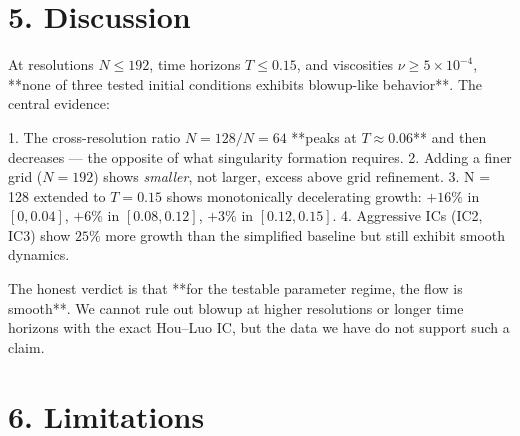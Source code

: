\documentclass[11pt]{article}
\begin{document}
\section{5. Discussion}

At resolutions \(N \le 192\), time horizons \(T \le 0.15\), and viscosities
\(\nu \ge 5 \times 10^{-4}\), **none of three tested initial conditions
exhibits blowup-like behavior**. The central evidence:

1. The cross-resolution ratio \(N = 128 / N = 64\) **peaks at
   \(T \approx 0.06\)** and then decreases — the opposite of what
   singularity formation requires.
2. Adding a finer grid (\(N = 192\)) shows \textit{smaller}, not larger,
   excess above grid refinement.
3. N = 128 extended to \(T = 0.15\) shows monotonically decelerating
   growth: \(+16\%\) in \([0, 0.04]\), \(+6\%\) in \([0.08, 0.12]\), \(+3\%\)
   in \([0.12, 0.15]\).
4. Aggressive ICs (IC2, IC3) show \(25\%\) more growth than the simplified
   baseline but still exhibit smooth dynamics.

The honest verdict is that **for the testable parameter regime, the
flow is smooth**. We cannot rule out blowup at higher resolutions or
longer time horizons with the exact Hou–Luo IC, but the data we have
do not support such a claim.


\section{6. Limitations}
\end{document}
